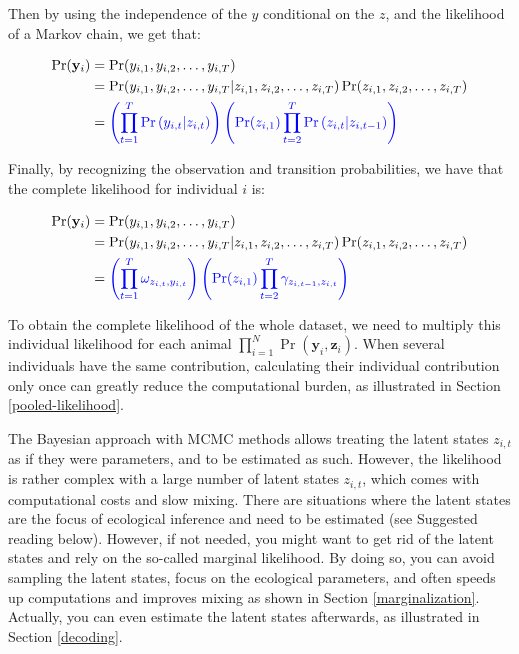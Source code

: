 \documentclass[
  12pt,
]{krantz}
\begin{document}
Then by using the independence of the \(y\) conditional on the \(z\), and the likelihood of a Markov chain, we get that:

\begin{align*}
\Pr(\mathbf{y}_i) &= \Pr(y_{i,1}, y_{i,2}, \ldots, y_{i,T})\\
                  &= \Pr(y_{i,1}, y_{i,2}, \ldots, y_{i,T} | z_{i,1}, z_{i,2}, \ldots, z_{i,T}) \Pr(z_{i,1}, z_{i,2}, \ldots, z_{i,T})\\
                &= \color{blue}{\left(\prod_{t=1}^T{\Pr{(y_{i,t} | z_{i,t})}}\right) \left(\Pr(z_{i,1}) \prod_{t=2}^T{\Pr{(z_{i,t} | z_{i,t-1})}}\right)}\\
\end{align*}

Finally, by recognizing the observation and transition probabilities, we have that the complete likelihood for individual \(i\) is:

\begin{align*}
\Pr(\mathbf{y}_i) &= \Pr(y_{i,1}, y_{i,2}, \ldots, y_{i,T})\\
                  &= \Pr(y_{i,1}, y_{i,2}, \ldots, y_{i,T} | z_{i,1}, z_{i,2}, \ldots, z_{i,T}) \Pr(z_{i,1}, z_{i,2}, \ldots, z_{i,T})\\
                &= \color{blue}{\left(\prod_{t=1}^T{\omega_{z_{i,t}, y_{i,t}}}\right) \left(\Pr(z_{i,1}) \prod_{t=2}^T{\gamma_{z_{i,t-1},z_{i,t}}}\right)}\\
\end{align*}

To obtain the complete likelihood of the whole dataset, we need to multiply this individual likelihood for each animal \(\displaystyle{\prod_{i=1}^N{\Pr(\mathbf{y}_i,\mathbf{z}_i)}}\). When several individuals have the same contribution, calculating their individual contribution only once can greatly reduce the computational burden, as illustrated in Section \ref{pooled-likelihood}.

The Bayesian approach with MCMC methods allows treating the latent states \(z_{i,t}\) as if they were parameters, and to be estimated as such. However, the likelihood is rather complex with a large number of latent states \(z_{i,t}\), which comes with computational costs and slow mixing. There are situations where the latent states are the focus of ecological inference and need to be estimated (see Suggested reading below). However, if not needed, you might want to get rid of the latent states and rely on the so-called marginal likelihood. By doing so, you can avoid sampling the latent states, focus on the ecological parameters, and often speeds up computations and improves mixing as shown in Section \ref{marginalization}. Actually, you can even estimate the latent states afterwards, as illustrated in Section \ref{decoding}.
\end{document}
